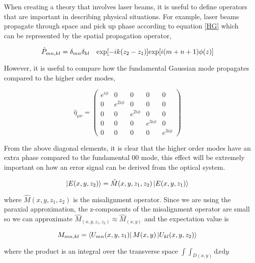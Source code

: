 \documentclass[oneside]{book}
\begin{document}
		When creating a theory that involves laser beams, it is useful to define operators that are important in describing physical situations.  For example, laser beams propagate through space and pick up phase according to equation \ref{HG} which can be represented by the spatial propagation operator,
		
		\begin{equation}
		\hat{P}_{mn,kl} = \delta_{mn} \delta_{kl} \quad \text{exp}[-ik(z_2 - z_1)] 
		\\ \text{exp}[i(m+n+1)\phi(z)]
		\end{equation}

		However, it is useful to compare how the fundamental Gaussian mode propagates compared to the higher order modes,

		\begin{equation} \label{GouyPhaseMatrix}
		\hat{\eta}_{\mu \nu} = 
		\begin{pmatrix}
		e^{i\phi}	&0			&0			& 0 			& 0
		\\ 0		&e^{2i\phi}	&0			& 0				& 0
		\\ 0		&0			&e^{2i\phi}	& 0				& 0
		\\ 0		&0			&0			& e^{3i\phi}	& 0
		\\ 0		&0			&0			& 0				& e^{3i\phi}
		\end{pmatrix}
		\end{equation}

		From the above diagonal elements, it is clear that the higher order modes have an extra phase compared to the fundamental 00 mode, this effect will be extremely important on how an error signal can be derived from the optical system.
		
		\begin{equation}
		\ket{E(x,y,z_2)} = \hat{M}(x,y,z_1,z_2)	\ket{E(x,y,z_1)}
		\end{equation}
		
		where $\hat{M}(x,y,z_1,z_2)$ is the misalignment operator.  Since we are using the paraxial approximation, the z-components of the misalignment operator are small so we can approximate $\hat{M}_(x,y,z_1,z_2) \approx \hat{M}_(x,y)$ and the expectation value is
		
		\begin{equation}
		M_{mn,kl}=  \bra{U_{mn}(x,y,z_1)} M(x,y) \ket{U_{kl}(x,y,z_2)}
		\end{equation}

		where the product is an integral over the transverse space $\int \!\!\! \int_{D(x,y)} \text{d}x \text{d}y$
		
\end{document}
